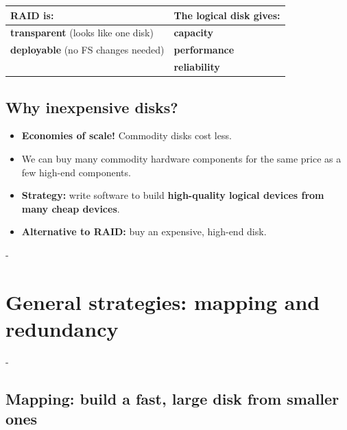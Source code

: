 \documentclass[11pt,a4paper]{article}
\makeatletter
\newcommand{\keepspace}[1]{\par\penalty-100\begingroup
  \setlength{\dimen@}{#1}\dimen@ii\pagegoal\advance\dimen@ii-\pagetotal
  \ifdim\dimen@>\dimen@ii\ifdim\dimen@ii>\z@\vfil\fi\break\fi\endgroup}
\makeatother
\begin{document}
\begin{center}
\renewcommand{\arraystretch}{1.2}
\begin{tabularx}{0.92\textwidth}{@{}X X@{}}
\toprule
\textbf{RAID is:} & \textbf{The logical disk gives:} \\
\midrule
\textbf{transparent} (looks like one disk) & \textbf{capacity} \\
\textbf{deployable} (no FS changes needed) & \textbf{performance} \\
 & \textbf{reliability} \\
\bottomrule
\end{tabularx}
\end{center}

\subsection{Why inexpensive disks?}

\begin{itemize}
  \item \textbf{Economies of scale!} Commodity disks cost less.
  \item We can buy many commodity hardware components for the same price as
        a few high-end components.
  \item \textbf{Strategy:} write software to build \textbf{high-quality
        logical devices from many cheap devices}.
  \item \textbf{Alternative to RAID:} buy an expensive, high-end disk.
\end{itemize}

\keepspace{9\baselineskip}
\section{General strategies: mapping and redundancy}


\keepspace{9\baselineskip}
\subsection{Mapping: build a fast, large disk from smaller ones}

\begin{center}
\end{center}
\end{document}
